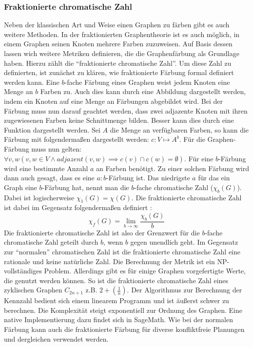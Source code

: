 \documentclass[a4paper,12pt,ngerman,chapterprefix=false,listof=totoc,bibliography=totoc]{scrreprt}
\begin{document}
\subsubsection*{Fraktionierte chromatische Zahl}
{
Neben der klassischen Art und Weise einen Graphen zu färben gibt es auch weitere Methoden. In der fraktionierten Graphentheorie ist es auch möglich, in einem Graphen seinen Knoten mehrere Farben zuzuweisen. Auf Basis dessen lassen wich weitere Metriken definieren, die die Graphenfärbung als Grundlage haben. Hierzu zählt die "`fraktionierte chromatische Zahl"'. Um diese Zahl zu definierten, ist zunächst zu klären, wie fraktionierte Färbung formal definiert werden kann. Eine \(b\)-fache Färbung eines Graphen weist jedem Knoten eine Menge an \(b\) Farben zu. Auch dies kann durch eine Abbildung dargestellt werden, indem ein Knoten auf eine Menge an Färbungen abgebildet wird. Bei der Färbung muss nun darauf geachtet werden, dass zwei adjazente Knoten mit ihren zugewiesenen Farben keine Schnittmenge bilden. Besser kann dies durch eine Funktion dargestellt werden. Sei \(A\) die Menge an verfügbaren Farben, so kann die Färbung mit folgendermaßen dargestellt werden: \(c: V\mapsto A^b\). Für die Graphen-Färbung muss nun gelten: \(\forall v,w(v,w\in V\land adjazent(v,w)\implies c(v)\cap c(w)=\emptyset)\). Für eine \(b\)-Färbung wird eine bestimmte Anzahl \(a\) an Farben benötigt. Zu einer solchen Färbung wird dann auch gesagt, dass es eine \(a:b\)-Färbung ist. Das niedrigste \(a\) für das ein Graph eine \(b\)-Färbung hat, nennt man die \(b\)-fache chromatische Zahl (\(\chi _b(G)\)). Dabei ist logischerweise \(\chi_1(G) = \chi (G)\). Die fraktionierte chromatische Zahl ist dabei im Gegensatz folgendermaßen definiert \cite{scheinerman_fractional_2011}:
\[\chi_f(G)=\lim_{b\to\infty}\frac{\chi_b(G)}{b}\]
Die fraktionierte chromatische Zahl ist also der Grenzwert für die \(b\)-fache chromatische Zahl geteilt durch \(b\), wenn \(b\) gegen unendlich geht. Im Gegensatz zur "`normalen"' chromatischen Zahl ist die fraktionierte chromatische Zahl eine rationale und keine natürliche Zahl. Die Berechnung der Metrik ist ein NP-vollständiges Problem. Allerdings gibt es für einige Graphen vorgefertigte Werte, die genutzt werden können. So ist die fraktionierte chromatische Zahl eines zyklischen Graphen \(C_{2n+1}\) z.B. \(2+(\frac{1}{n})\). Der Algorithmus zur Berechnung der Kennzahl bedient sich einem linearem Programm und ist äußerst schwer zu berechnen. Die Komplexität steigt exponentiell zur Ordnung des Graphen. Eine native Implementierung dazu findet sich in SageMath. Wie bei der normalen Färbung kann auch die fraktionierte Färbung für diverse konfliktfreie Planungen und dergleichen verwendet werden. \cite{weisstein_chromatic_nodate,sagemath_graph_2020-1,scheinerman_fractional_2011}
}
\end{document}
